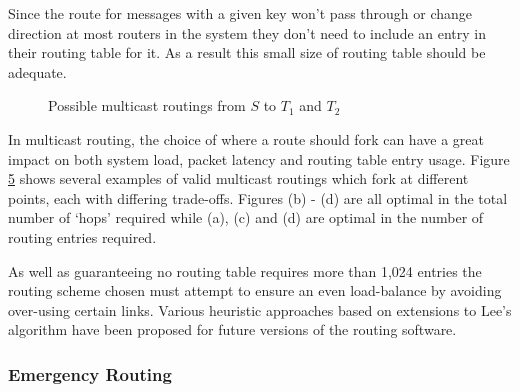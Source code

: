 				Since the route for messages with a given key won't pass through or
				change direction at most routers in the system they don't need to
				include an entry in their routing table for it. As a result this small
				size of routing table should be adequate.
				
				\begin{figure}
					\begin{subfigure}[b]{0.24\textwidth}
						\center
						
						\caption{}
						\label{fig:multicast-routing-a}
					\end{subfigure}
					\begin{subfigure}[b]{0.24\textwidth}
						\center
						
						\caption{}
						\label{fig:multicast-routing-b}
					\end{subfigure}
					\begin{subfigure}[b]{0.24\textwidth}
						\center
						
						\caption{}
						\label{fig:multicast-routing-c}
					\end{subfigure}
					\begin{subfigure}[b]{0.24\textwidth}
						\center
						
						\caption{}
						\label{fig:multicast-routing-d}
					\end{subfigure}
					\caption{Possible multicast routings from $S$ to $T_1$ and $T_2$}
					\label{fig:multicast-routing}
				\end{figure}
				
				In multicast routing, the choice of where a route should fork can have a
				great impact on both system load, packet latency and routing table entry
				usage. Figure \ref{fig:multicast-routing} shows several examples of
				valid multicast routings which fork at different points, each with
				differing trade-offs. Figures (b) - (d) are all optimal in the total
				number of `hops' required while (a), (c) and (d) are optimal in the
				number of routing entries required.
				
				As well as guaranteeing no routing table requires more than 1,024
				entries the routing scheme chosen must attempt to ensure an even
				load-balance by avoiding over-using certain links. Various heuristic
				approaches based on extensions to Lee's algorithm have been proposed for
				future versions of the routing software\cite{davidson13}.
			
			\subsubsection{Emergency Routing}
				
